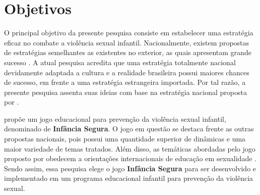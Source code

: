 


\section{Objetivos}\label{sec:Objetivos}

O principal objetivo da presente pesquisa consiste em estabelecer uma estratégia eficaz no combate a violência sexual infantil. Nacionalmente, existem propostas de estratégias semelhantes as existentes no exterior, as quais apresentam grande sucesso \cite{steiler2012orbit, jones2020serious}. A atual pesquisa acredita que uma estratégia totalmente nacional devidamente adaptada a cultura e a realidade brasileira possui maiores chances de sucesso, em frente a uma estratégia estrangeira importada. Por tal razão, a presente pesquisa assenta suas ideias com base na estratégia nacional proposta por .

 propõe um jogo educacional para prevenção da violência sexual infantil, denominado de \textbf{Infância Segura}. O jogo em questão se destaca frente as outras propostas nacionais, pois possui uma quantidade superior de dinâmicas e uma maior variedade de temas tratados. Além disso, as temáticas abordadas pelo jogo proposto por  obedecem a orientações internacionais de educação em sexualidade \cite{unesco2018international}. Sendo assim, essa pesquisa elege o jogo \textbf{Infância Segura} para ser desenvolvido e implementado em um programa educacional infantil para prevenção da violência sexual.

